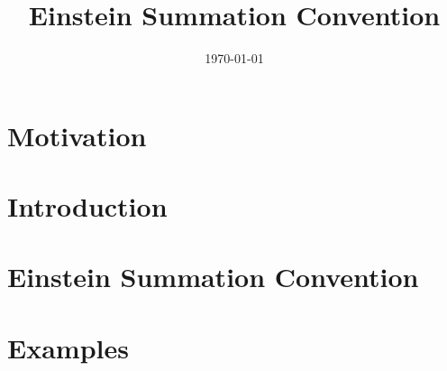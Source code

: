\documentclass{article}
\title{Einstein Summation Convention}
\author{}
\date{\today}
\begin{document}
	\maketitle
	
	\section{Motivation}
	\label{sec: motivation}
	
	
	\section{Introduction}
	\label{sec: introduction}
	
	
	\section{Einstein Summation Convention}
	\label{sec: einstein summation convention}
	
	
	\section{Examples}
	\label{sec: examples}
	
	
	
		
	
	
\end{document}
